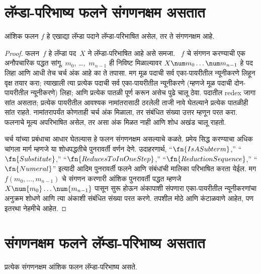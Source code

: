 \section{लॅम्डा-परिभाष्य फलने संगणनक्षम असतात}\label{lam:int:cmp:sec}

\begin{thm}
\label{lam:int:cmp:thm:lambda-computable}
आंशिक फलन $f$ हे एखाद्या लॅम्डा पदाने लॅम्डा-परिभाषित
असेल, तर ते संगणनक्षम आहे.
\end{thm}

\begin{proof}
फलन~$f$ हे लॅम्डा पद~$X$ ने लॅम्डा-परिभाषित आहे असे समजा.
~$f$ चे संगणन करण्याची एक अनौपचारिक पद्धत सांगू.
$m_0$, \dots,~$m_{n-1}$ ही निविष्ट मिळाल्यावर
$X \num m_0 \ldots \num m_{n-1}$ हे पद लिहा आणि आधी तेच चर्च अंक आहे का ते तपासा.
मग मूळ पदाची सर्व एका-पायरीतील न्यूनीकरणे लिहून वृक्ष तयार करा;
त्याखाली त्या प्रत्येक पदाची सर्व एका-पायरीतील न्यूनीकरणे
(म्हणजे मूळ पदाची दोन-पायरीतील न्यूनीकरणे) लिहा; आणि
प्रत्येक पातळी पूर्ण करून असेच पुढे चालू ठेवा. पदातील redex
जागा सांत असतात; प्रत्येक पायरीतील आवश्यक नामांतरासाठी
ठरलेली ताजी नावे घेतल्याने प्रत्येक पातळीही सांत राहते.
नामांतरापर्यंत कोणताही चर्च अंक मिळाला, तर संबंधित संख्या
उत्तर म्हणून परत करा. फलनाचे मूल्य अपरिभाषित असेल, तर
असा अंक मिळत नाही आणि शोध अखंड चालू राहतो.

चर्च यांच्या प्रबंधाचा आधार घेतल्यास हे फलन संगणनक्षम
असल्याचे कळते. प्रमेय सिद्ध करण्याचा अधिक चांगला मार्ग
म्हणजे या शोधपद्धतीचे पुनरावर्ती वर्णन देणे. उदाहरणार्थ,
“$\fn{IsASubterm}$,” “$\fn{Substitute}$,”
“$\fn{ReducesToInOneStep}$,” “$\fn{ReductionSequence}$,”
“$\fn{Numeral}$” इत्यादी आदिम पुनरावर्ती फलने आणि
संबंधांची मालिका परिभाषित करता येईल. मग
$f(m_0, \dots, m_{n-1})$ चे संगणन करणारी आंशिक
पुनरावर्ती पद्धत म्हणजे $X \num{m_0} \dots \num{m_{n-1}}$
पासून सुरू होऊन अंकापाशी संपणारा एका-पायरीतील
न्यूनीकरणांचा अनुक्रम शोधणे आणि त्या अंकाशी संबंधित
संख्या परत करणे. तपशील मोठे आणि कंटाळवाणे आहेत,
पण इतरथा नेहमीचे आहेत.
\end{proof}











\section{संगणनक्षम फलने लॅम्डा-परिभाष्य असतात}\label{lam:int:lrp:sec}

\begin{thm}
\label{lam:int:lrp:thm:computable-lambda}
प्रत्येक संगणनक्षम आंशिक फलन लॅम्डा-परिभाष्य असते.
\end{thm}

